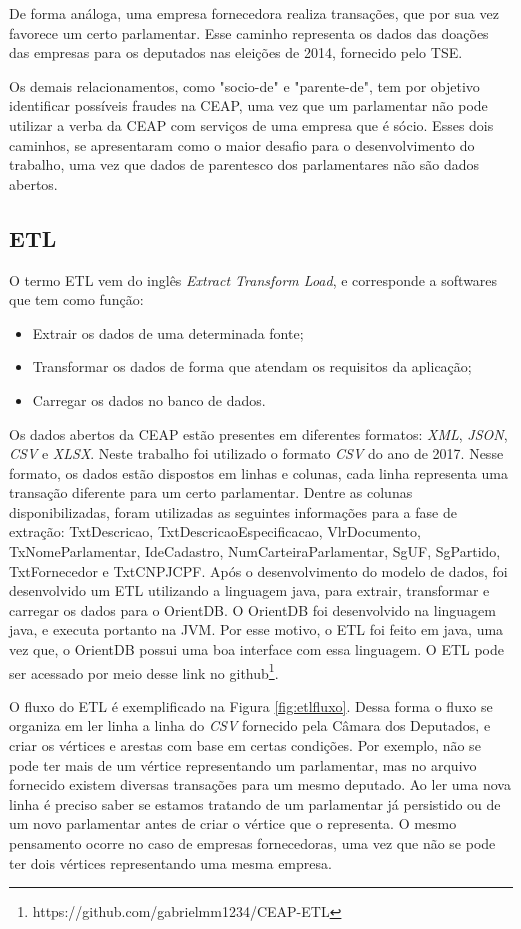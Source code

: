 De forma análoga, uma empresa fornecedora realiza transações, que por sua vez favorece um certo parlamentar. Esse caminho representa os dados das doações das empresas para os deputados nas eleições de 2014, fornecido pelo TSE. 

Os demais relacionamentos, como "socio-de" e "parente-de", tem por objetivo identificar possíveis fraudes na CEAP, uma vez que um parlamentar não pode utilizar a verba da CEAP com serviços de uma empresa que é sócio. Esses dois caminhos, se apresentaram como o maior desafio para o desenvolvimento do trabalho, uma vez que dados de parentesco dos parlamentares não são dados abertos.

\subsection{ETL} \label{etl-subsection}

	O termo ETL vem do inglês \textit{Extract Transform Load}, e corresponde a softwares que tem como função:
\begin{itemize}
		\item Extrair os dados de uma determinada fonte;
		\item Transformar os dados de forma que atendam os requisitos da aplicação;
		\item Carregar os dados no banco de dados.
\end{itemize}
	
	Os dados abertos da CEAP estão presentes em diferentes formatos: \textit{XML}, \textit{JSON}, \textit{CSV} e \textit{XLSX}. Neste trabalho foi utilizado o formato \textit{CSV} do ano de 2017. Nesse formato, os dados estão dispostos em linhas e colunas, cada linha representa uma transação diferente para um certo parlamentar. Dentre as colunas disponibilizadas, foram utilizadas as seguintes informações para a fase de extração: TxtDescricao, TxtDescricaoEspecificacao, VlrDocumento, TxNomeParlamentar, IdeCadastro, NumCarteiraParlamentar, SgUF, SgPartido, TxtFornecedor e TxtCNPJCPF. Após o desenvolvimento do modelo de dados, foi desenvolvido um ETL utilizando a linguagem java, para extrair, transformar e carregar os dados para o OrientDB. O OrientDB foi desenvolvido na linguagem java, e executa portanto na JVM. Por esse motivo, o ETL foi feito em java, uma vez que, o OrientDB possui uma boa interface com essa linguagem. O ETL pode ser acessado por meio desse link no github\footnote{https://github.com/gabrielmm1234/CEAP-ETL}.
	
	O fluxo do ETL é exemplificado na Figura \ref{fig:etlfluxo}. Dessa forma o fluxo se organiza em ler linha a linha do \textit{CSV} fornecido pela Câmara dos Deputados, e criar os vértices e arestas com base em certas condições. Por exemplo, não se pode ter mais de um vértice representando um parlamentar, mas no arquivo fornecido existem diversas transações para um mesmo deputado. Ao ler uma nova linha é preciso saber se estamos tratando de um parlamentar já persistido ou de um novo parlamentar antes de criar o vértice que o representa. O mesmo pensamento ocorre no caso de empresas fornecedoras, uma vez que não se pode ter dois vértices representando uma mesma empresa.
	
